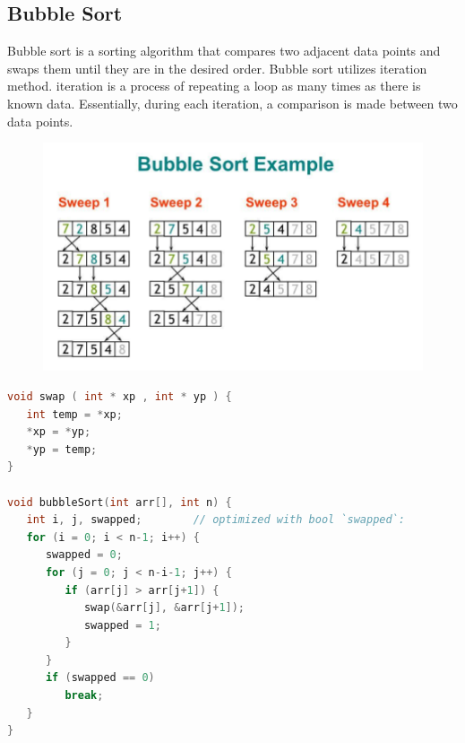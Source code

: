 \subsection{Bubble Sort}
Bubble sort is a sorting algorithm that compares two adjacent data points and swaps them until they are in the desired order. 
Bubble sort utilizes iteration method. iteration is a process of repeating a loop as many times as there is known data. 
Essentially, during each iteration, a comparison is made between two data points.

\begin{figure}[H]
    \centering
    \includegraphics[width=0.7\linewidth]{../P4/img/screenshot006.png}
    \caption{}
    \label{fig:enam}
\end{figure}
\begin{lstlisting}[language=c,caption=Bubble Sort Implementation]
void swap ( int * xp , int * yp ) {
   int temp = *xp;
   *xp = *yp;
   *yp = temp;
}

void bubbleSort(int arr[], int n) {
   int i, j, swapped;        // optimized with bool `swapped`:
   for (i = 0; i < n-1; i++) {
      swapped = 0;
      for (j = 0; j < n-i-1; j++) {
         if (arr[j] > arr[j+1]) {
            swap(&arr[j], &arr[j+1]);
            swapped = 1;
         }
      }
      if (swapped == 0)
         break;
   }
}
\end{lstlisting}

